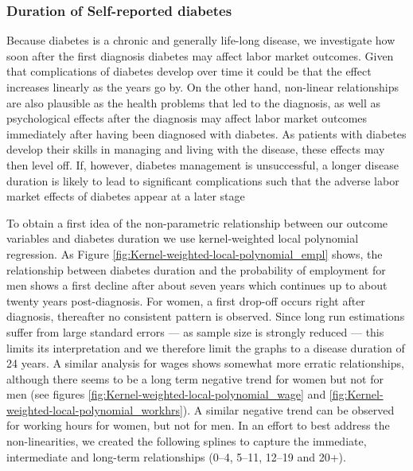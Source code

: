 \documentclass[12pt,english,british]{article}
\begin{document}
\FloatBarrier

\subsubsection{Duration of Self-reported  diabetes }

Because diabetes is a chronic and generally life-long disease, we investigate how soon after the first diagnosis diabetes may affect labor market outcomes. Given that complications of diabetes develop over time it could be that the effect increases
linearly as the years go by. On the other hand, non-linear relationships
are also plausible as the health problems that led to the diagnosis, as well as psychological effects after the diagnosis may 
affect labor market outcomes immediately after having been diagnosed with diabetes. As patients with diabetes develop their skills in managing and living with the disease, these effects may then level off. If, however, diabetes management is unsuccessful, a longer disease duration is likely to lead to significant complications such  that the adverse labor market effects of diabetes appear at a later stage


To obtain a first idea of the non-parametric relationship between our outcome variables and diabetes duration
we use kernel-weighted local polynomial regression. As Figure \ref{fig:Kernel-weighted-local-polynomial_empl}
shows, the relationship between diabetes duration and the probability of employment  for men
shows a first
decline after about seven years 
which continues up to about twenty years post-diagnosis. For women,
a first drop-off occurs right after diagnosis, thereafter no consistent
pattern is observed. Since long run estimations suffer from large standard errors --- as sample size is strongly reduced --- this 
limits its interpretation and we therefore limit the graphs to a disease duration of 24 years. A similar analysis for wages shows
somewhat more erratic relationships, although there seems to be a long term negative trend for women but not for men (see figures \ref{fig:Kernel-weighted-local-polynomial_wage} and \ref{fig:Kernel-weighted-local-polynomial_workhrs}).  A similar negative trend can be observed for working hours for women, but not for men.
In an effort to best address the non-linearities, we created the following splines to
capture the immediate, intermediate and long-term relationships (0--4,
5--11, 12--19 and 20+).   
  
  
\end{document}
